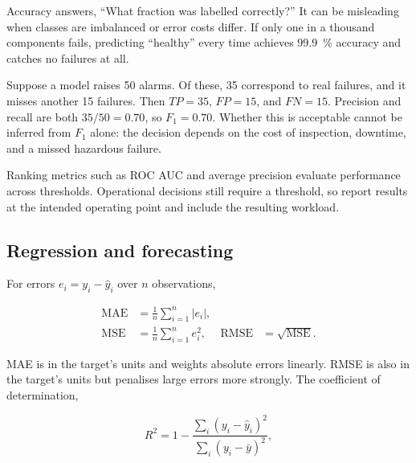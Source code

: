 Accuracy answers, ``What fraction was labelled correctly?''
It can be misleading when classes are imbalanced or error costs differ.
If only one in a thousand components fails, predicting ``healthy'' every time
achieves \qty{99.9}{\percent} accuracy and catches no failures at all.

\begin{workedexample}
Suppose a model raises 50 alarms.
Of these, 35 correspond to real failures, and it misses another 15 failures.
Then $TP=35$, $FP=15$, and $FN=15$.
Precision and recall are both $35/50=0.70$, so $F_1=0.70$.
Whether this is acceptable cannot be inferred from $F_1$ alone: the decision
depends on the cost of inspection, downtime, and a missed hazardous failure.
\end{workedexample}

Ranking metrics such as ROC AUC and average precision evaluate performance
across thresholds.
Operational decisions still require a threshold, so report results at the
intended operating point and include the resulting workload.

\subsection{Regression and forecasting}

For errors $e_i=y_i-\hat y_i$ over $n$ observations,

\begin{align}
    \operatorname{MAE} &= \frac{1}{n}\sum_{i=1}^{n}|e_i|,
    \label{eq:mae}\\
    \operatorname{MSE} &= \frac{1}{n}\sum_{i=1}^{n}e_i^2,
    &\operatorname{RMSE} &= \sqrt{\operatorname{MSE}}.
    \label{eq:mse-rmse}
\end{align}

MAE is in the target's units and weights absolute errors linearly.
RMSE is also in the target's units but penalises large errors more strongly.
The coefficient of determination,

\begin{equation}
    R^2 = 1 -
    \frac{\sum_i(y_i-\hat y_i)^2}
         {\sum_i(y_i-\bar y)^2},
    \label{eq:r-squared}
\end{equation}

